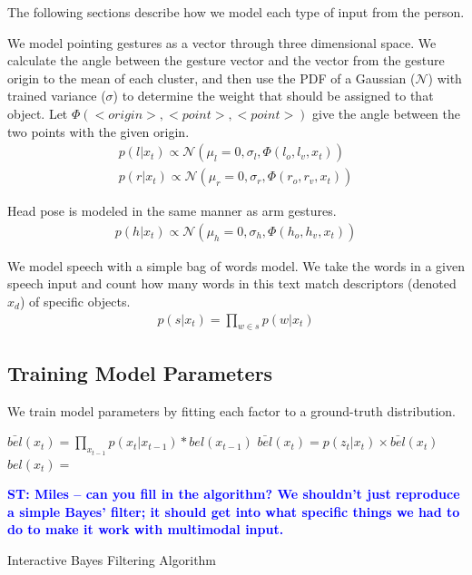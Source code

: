\documentclass[letterpaper, 10 pt, conference]{ieeeconf}
\newcommand{\stnote}[1]{\textcolor{Blue}{\textbf{ST: #1}}}
\newcommand{\menote}[1]{\textcolor{Red}{\textbf{ME: #1}}}
\begin{document}
\noindent The following sections describe how we model each type of
input from the person.

  We model pointing gestures as a vector through three
dimensional space. We calculate the angle between the gesture vector
and the vector from the gesture origin to the mean of each cluster,
and then use the PDF of a Gaussian ($\mathcal{N}$) with trained variance ($\sigma$) to determine
the weight that should be assigned to that object. Let $\Phi(<origin>,
<point>, <point>)$ give the angle between the two points with the
given origin.
\begin{align}
p(l | x_t) \propto \mathcal{N}(\mu_l=0, \sigma_l,\Phi(l_o, l_v, x_t))\\
p(r | x_t) \propto \mathcal{N}(\mu_r=0, \sigma_r,\Phi(r_o, r_v, x_t))
\end{align}

Head pose is modeled in the same manner as arm gestures.
\begin{align}
p(h | x_t) \propto \mathcal{N}(\mu_h=0, \sigma_h,\Phi(h_o, h_v, x_t))
\end{align}


We model speech with a simple bag of words model. We take the words in a given speech input and count how many words in this text match descriptors (denoted  $x_d$) of specific objects.
\begin{align}
p(s |x_t) = \displaystyle \prod_{w \in s} p(w | x_t)
\end{align}

\subsection{Training Model Parameters}

We train model parameters by fitting each factor to a ground-truth
distribution.

\begin{algorithm}
    \DontPrintSemicolon
    \KwIn{$bel(x_{t-1}), u_t, z_t$ \menote{What is $u_t$?}}
    \BlankLine
    \BlankLine
     {
      $\bar{bel}(x_t) = \displaystyle\prod_{x_{t-1}} p(x_t|x_{t-1})*bel(x_{t-1})$
      \BlankLine
      $\bar{bel}(x_t) = p(z_t | x_t) \times\bar{bel}(x_t)$
      \BlankLine
      $bel(x_t) = $

    }
    \BlankLine
      \stnote{Miles -- can you fill in the algorithm?  We shouldn't just reproduce a simple Bayes' filter; it should get into what specific things we had to do to make it work with multimodal input.}
\caption{Interactive Bayes Filtering Algorithm} 
\label{alg:algorithm}
\end{algorithm}
\end{document}
